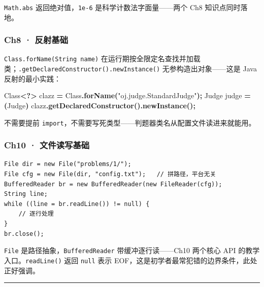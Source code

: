 \documentclass[
  11pt,
]{ctexart}
\newenvironment{Shaded}{\begin{snugshade}}{\end{snugshade}}
\newcommand{\BuiltInTok}[1]{#1}
\newcommand{\FunctionTok}[1]{\textcolor[rgb]{0.13,0.29,0.53}{\textbf{#1}}}
\newcommand{\NormalTok}[1]{#1}
\newcommand{\OperatorTok}[1]{\textcolor[rgb]{0.81,0.36,0.00}{\textbf{#1}}}
\newcommand{\StringTok}[1]{\textcolor[rgb]{0.31,0.60,0.02}{#1}}
\begin{document}
\texttt{Math.abs} 返回绝对值，\texttt{1e-6} 是科学计数法字面量------两个
Ch8 知识点同时落地。

\hypertarget{ch8-ux53cdux5c04ux57faux7840}{%
\subsubsection{Ch8 · 反射基础}\label{ch8-ux53cdux5c04ux57faux7840}}

\texttt{Class.forName(String\ name)}
在运行期按全限定名查找并加载类；\texttt{.getDeclaredConstructor().newInstance()}
无参构造出对象------这是 Java 反射的最小实践：

\begin{Shaded}
\begin{Highlighting}[]
\BuiltInTok{Class}\OperatorTok{\textless{}?\textgreater{}}\NormalTok{ clazz }\OperatorTok{=} \BuiltInTok{Class}\OperatorTok{.}\FunctionTok{forName}\OperatorTok{(}\StringTok{"oj.judge.StandardJudge"}\OperatorTok{);}
\NormalTok{Judge judge }\OperatorTok{=} \OperatorTok{(}\NormalTok{Judge}\OperatorTok{)}\NormalTok{ clazz}\OperatorTok{.}\FunctionTok{getDeclaredConstructor}\OperatorTok{().}\FunctionTok{newInstance}\OperatorTok{();}
\end{Highlighting}
\end{Shaded}

不需要提前
\texttt{import}，不需要写死类型------判题器类名从配置文件读进来就能用。

\hypertarget{ch10-ux6587ux4ef6ux8bfbux5199ux57faux7840}{%
\subsubsection{Ch10 ·
文件读写基础}\label{ch10-ux6587ux4ef6ux8bfbux5199ux57faux7840}}

\begin{verbatim}
File dir = new File("problems/1/");
File cfg = new File(dir, "config.txt");   // 拼路径，平台无关
BufferedReader br = new BufferedReader(new FileReader(cfg));
String line;
while ((line = br.readLine()) != null) {
    // 逐行处理
}
br.close();
\end{verbatim}

\texttt{File} 是路径抽象，\texttt{BufferedReader} 带缓冲逐行读------Ch10
两个核心 API 的教学入口。\texttt{readLine()} 返回 \texttt{null} 表示
EOF，这是初学者最常犯错的边界条件，此处正好强调。

\begin{center}\rule{0.5\linewidth}{0.5pt}\end{center}
\end{document}
